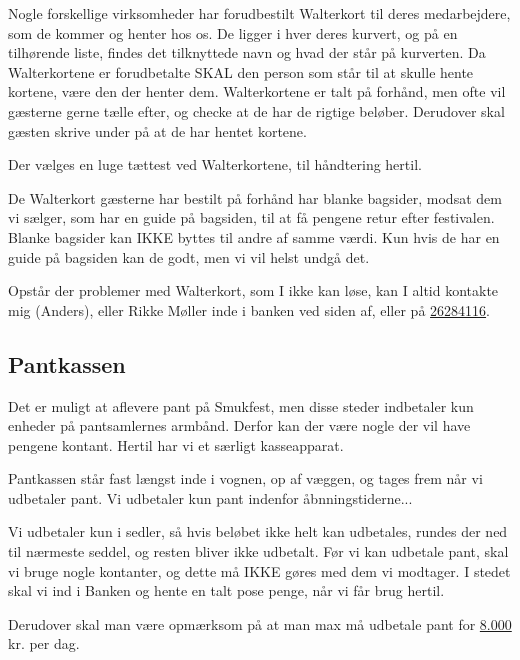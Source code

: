 Nogle forskellige virksomheder har forudbestilt Walterkort til deres medarbejdere, 
som de kommer og henter hos os. 
De ligger i hver deres kurvert, og på en tilhørende liste, findes det tilknyttede navn 
og hvad der står på kurverten.
Da Walterkortene er forudbetalte SKAL den person 
som står til at skulle hente kortene, være den der henter dem.
Walterkortene er talt på forhånd, men ofte vil gæsterne gerne tælle efter, 
og checke at de har de rigtige beløber.
Derudover skal gæsten skrive under på at de har hentet kortene.

Der vælges en luge tættest ved Walterkortene, til håndtering hertil.

De Walterkort gæsterne har bestilt på forhånd har blanke bagsider, modsat dem vi sælger,
som har en guide på bagsiden, til at få pengene retur efter festivalen.
Blanke bagsider kan IKKE byttes til andre af samme værdi. Kun hvis de har en guide på bagsiden 
kan de godt, men vi vil helst undgå det.

Opstår der problemer med Walterkort, som I ikke kan løse, kan I altid kontakte mig (Anders), eller Rikke Møller 
inde i banken ved siden af, eller på \underline{26284116}. 

\subsection{Pantkassen}

Det er muligt at aflevere pant på Smukfest, men disse steder indbetaler kun enheder på pantsamlernes armbånd.
Derfor kan der være nogle der vil have pengene kontant. Hertil har vi et særligt kasseapparat.

Pantkassen står fast længst inde i vognen, op af væggen, og tages frem når vi udbetaler pant.
Vi udbetaler kun pant indenfor åbnningstiderne...

Vi udbetaler kun i sedler, så hvis beløbet ikke helt kan udbetales, rundes der ned 
til nærmeste seddel, og resten bliver ikke udbetalt. 
Før vi kan udbetale pant, skal vi bruge nogle kontanter, og dette må IKKE gøres med dem vi modtager.
I stedet skal vi ind i Banken og hente en talt pose penge, når vi får brug hertil.

Derudover skal man være opmærksom på at man max må udbetale pant for \underline{8.000} kr. per dag.

